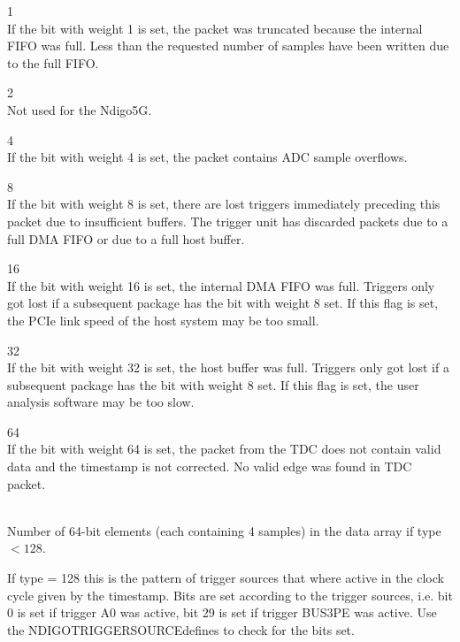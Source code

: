     \par
    \indent{} 1\\
    \indent If the bit with weight 1 is set, the packet was truncated because the internal FIFO was full. Less than the requested number of samples have been written due to the full FIFO.\par
    \indent{} 2\\
    Not used for the Ndigo5G.\par
    \indent{} 4\\
    \indent If the bit with weight 4 is set, the packet contains ADC sample overflows.\par
    \indent{} 8\\
    \indent If the bit with weight 8 is set, there are lost triggers immediately preceding this packet due to insufficient buffers. The trigger unit has discarded packets due to a full DMA FIFO or due to a full host buffer.\par
    \indent{} 16\\
    \indent If the bit with weight 16 is set, the internal DMA FIFO was full. Triggers only got lost if a subsequent package has the bit with weight 8 set. If this flag is set, the PCIe link speed of the host system may be too small.\par
    \indent{} 32\\
    \indent If the bit with weight 32 is set, the host buffer was full. Triggers only got lost if a subsequent package has the bit with weight 8 set. If this flag is set, the user analysis software may be too slow.\par
    \indent{} 64\\
    \indent If the bit with weight 64 is set, the packet from the TDC does not contain valid data and the timestamp is not corrected. No valid edge was found in TDC packet.\par

    \\
    Number of 64-bit elements (each containing 4 samples) in the data array if type $< 128$.\par

    If type = 128 this is the pattern of trigger sources that where active in the clock cycle given by the timestamp. Bits are set according to the trigger sources, i.e. bit 0 is set if trigger A0 was active, bit 29 is set if trigger BUS3\tu PE was active. Use the \textsf{NDIGO\tu TRIGGER\tu SOURCE\tu *defines}{} to check for the bits set.\par


